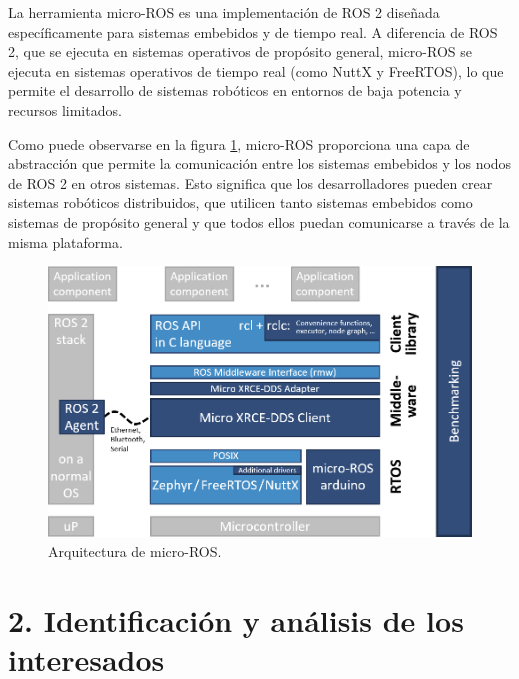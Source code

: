 \documentclass[
11pt, %
codirector, %
]{charter}
\begin{document}
La herramienta micro-ROS es una implementación de ROS 2 diseñada específicamente para sistemas embebidos y de tiempo real. A diferencia de ROS 2, que se ejecuta en sistemas operativos de propósito general, micro-ROS se ejecuta en sistemas operativos de tiempo real (como NuttX y FreeRTOS), lo que permite el desarrollo de sistemas robóticos en entornos de baja potencia y recursos limitados.

Como puede observarse en la figura \ref{fig:microROSarch}, micro-ROS proporciona una capa de abstracción que permite la comunicación entre los sistemas embebidos y los nodos de ROS 2 en otros sistemas.
Esto significa que los desarrolladores pueden crear sistemas robóticos distribuidos, que utilicen tanto sistemas embebidos como sistemas de propósito general y que todos ellos puedan comunicarse a través de la misma plataforma.

\begin{figure}[htpb]
\centering 
\includegraphics[width=.7\textwidth]{./imgs/micro-ROS_architecture.png}
\caption{Arquitectura de micro-ROS.}
\label{fig:microROSarch}
\end{figure}

\section{2. Identificación y análisis de los interesados}
\label{sec:interesados}
\end{document}
